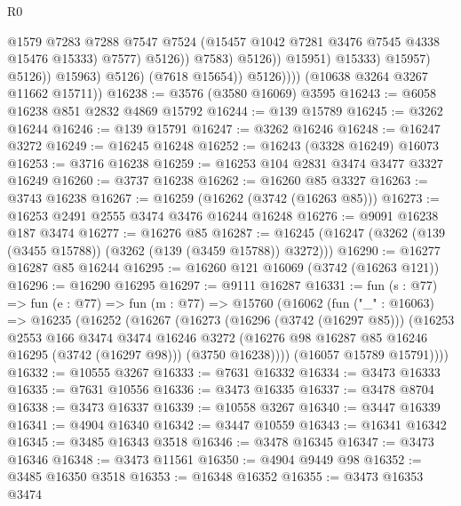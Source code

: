 \begin{lexlean}{R0}
\begin{coremodule}
                                          @1579
                                          @7283
                                          @7288
                                          @7547
                                          @7524
                                          (@15457 @1042 @7281 @3476 @7545 @4338 @15476 @15333)
                                          @7577)
                                        @5126))
                                    @7583)
                                  @5126))
                              @15951)
                            @15333)
                          @15957)
                        @5126))
                    @15963)
                  @5126)
                (@7618 @15654))
              @5126))))
      (@10638 @3264 @3267 @11662 @15711))
@16238 := @3576 (@3580 @16069) @3595
@16243 := @6058 @16238 @851 @2832 @4869 @15792
@16244 := @139 @15789
@16245 := @3262 @16244
@16246 := @139 @15791
@16247 := @3262 @16246
@16248 := @16247 @3272
@16249 := @16245 @16248
@16252 := @16243 (@3328 @16249) @16073
@16253 := @3716 @16238
@16259 := @16253 @104 @2831 @3474 @3477 @3327 @16249
@16260 := @3737 @16238
@16262 := @16260 @85 @3327
@16263 := @3743 @16238
@16267 := @16259 (@16262 (@3742 (@16263 @85)))
@16273 := @16253 @2491 @2555 @3474 @3476 @16244 @16248
@16276 := @9091 @16238 @187 @3474
@16277 := @16276 @85
@16287 := @16245 (@16247 (@3262 (@139 (@3455 @15788)) (@3262 (@139 (@3459 @15788)) @3272)))
@16290 := @16277 @16287 @85 @16244
@16295 := @16260 @121 @16069 (@3742 (@16263 @121))
@16296 := @16290 @16295
@16297 := @9111 @16287
@16331 := fun (s : @77) =>
  fun (e : @77) =>
  fun (m : @77) =>
  @15760
    (@16062
      (fun ("_" : @16063) =>
      @16235
        (@16252
          (@16267
            (@16273
              (@16296 (@3742 (@16297 @85)))
              (@16253
                @2553
                @166
                @3474
                @3474
                @16246
                @3272
                (@16276 @98 @16287 @85 @16246 @16295 (@3742 (@16297 @98)))
                (@3750 @16238))))
          (@16057 @15789 @15791))))
@16332 := @10555 @3267
@16333 := @7631 @16332
@16334 := @3473 @16333
@16335 := @7631 @10556
@16336 := @3473 @16335
@16337 := @3478 @8704
@16338 := @3473 @16337
@16339 := @10558 @3267
@16340 := @3447 @16339
@16341 := @4904 @16340
@16342 := @3447 @10559
@16343 := @16341 @16342
@16345 := @3485 @16343 @3518
@16346 := @3478 @16345
@16347 := @3473 @16346
@16348 := @3473 @11561
@16350 := @4904 @9449 @98
@16352 := @3485 @16350 @3518
@16353 := @16348 @16352
@16355 := @3473 @16353 @3474

\end{coremodule}
\end{lexlean}
